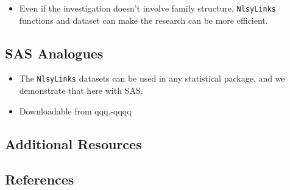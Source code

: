 \documentclass[smallextended]{svjour3}       %
\providecommand{\tightlist}{%
  \setlength{\itemsep}{0pt}\setlength{\parskip}{0pt}}
\begin{document}
\begin{itemize}
\tightlist
\item
  Even if the investigation doesn't involve family structure,
  \texttt{NlsyLinks} functions and dataset can make the research can be
  more efficient.
\end{itemize}

\hypertarget{sas-analogues}{%
\subsection{SAS Analogues}\label{sas-analogues}}

\begin{itemize}
\tightlist
\item
  The \texttt{NlsyLinks} datasets can be used in any statistical
  package, and we demonstrate that here with SAS.
\item
  Downloadable from qqq.-qqqq
\end{itemize}

\hypertarget{additional-resources}{%
\subsection{Additional Resources}\label{additional-resources}}

\hypertarget{references}{%
\subsection{References}\label{references}}




\end{document}
